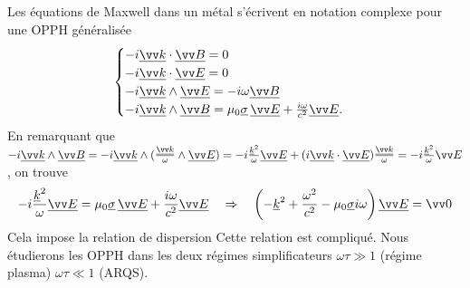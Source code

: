 \documentclass[12pt,fancy]{cours}
\begin{document}
Les équations de Maxwell dans un métal s'écrivent en notation complexe pour une OPPH généralisée
\begin{equation}
\begin{cases}
-i \udl{\Vec{k}} \ps \udl{\B}=0 \\
-i \udl{\Vec{k}} \ps \udl{\E}=0 \\
-i \udl{\Vec{k}} \pv \udl{\E} = -i \omega \udl{\B}\\
-i \udl{\Vec{k}} \pv \udl{\B} =\mu_0\udl{\sigma} \,\udl{\E} + \frac{i \omega}{c^2} \udl{\E}.
\end{cases}
\end{equation}
En remarquant que $-i \udl{\Vec{k}} \pv \udl{\B} = -i \udl{\Vec{k}} \pv ( \frac{\udl{\Vec{k}}}{\omega} \pv \udl{\E} ) = -i \frac{\udl{k}^2}{\omega} \udl{\E} + (i \udl{\Vec{k}} \ps \udl{\E}) \frac{\udl{\Vec{k}}}{\omega} = -i \frac{\udl{k}^2}{\omega} \E$, on trouve
\begin{equation}
  -i \frac{\udl{k}^2}{\omega} \udl{\E} =  \mu_0\udl{\sigma} \,\udl{\E} + \frac{i \omega}{c^2} \udl{\E} \Rar \left( -\underline{k}^2+\frac{\omega^2}{c^2}-\mu_0\underline{\sigma} i\omega\right) \udl{\E} = \Vec{0}
\end{equation}
Cela impose la relation de dispersion
Cette relation est compliqué. Nous étudierons les OPPH dans les deux régimes simplificateurs $\omega \tau \gg 1$ (régime plasma) $\omega \tau \ll 1$ (ARQS).

\end{document}
